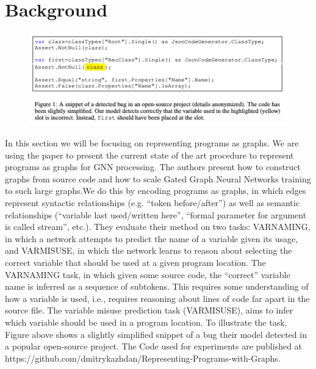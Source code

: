 \documentclass{article}
\begin{document}

\section{Background}

\begin{figure}[ht]
\vskip 0.2in
\begin{center}
\centerline{\includegraphics[width=\columnwidth]{Images/Background1.png}}
\label{icml-historical}
\end{center}
\vskip -0.2in
\end{figure}
In this section we will be focusing on representing programs as graphs. We are using the paper \cite{allamanis2017learning} to present the current state of the art procedure to represent programs as graphs for GNN processing. The authors present how to construct graphs from source code and how to scale Gated Graph Neural Networks training to such large graphs.We do this by encoding programs as graphs, in which edges represent syntactic relationships (e.g. “token before/after”) as well as semantic relationships (“variable last used/written here”, “formal parameter for argument is called stream”, etc.). They evaluate their method on two tasks: VARNAMING, in which a network attempts to predict the name of a variable given its usage, and VARMISUSE, in which the network learns to reason about selecting the correct variable that should be used at a given program location. The VARNAMING task, in which given some source code, the “correct” variable name is inferred as a sequence of subtokens. This requires some understanding of how a variable is used, i.e., requires reasoning about lines of code far apart in the source file. The variable misuse prediction task (VARMISUSE), aims to infer which variable should be used in a program location. To illustrate the task, Figure above shows a slightly simplified snippet of a bug their model detected in a popular open-source project. The Code used for experiments are published at https://github.com/dmitrykazhdan/Representing-Programs-with-Graphs.
\end{document}
